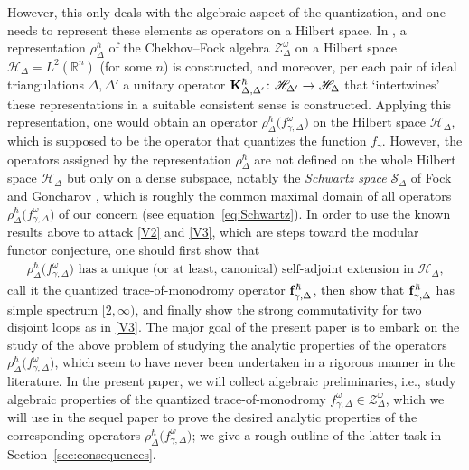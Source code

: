 \documentclass[pdftex]{sigma}
\numberwithin{equation}{section}
\theoremstyle{definition}
\begin{document}
However, this only deals with the algebraic aspect of the quantization, and one needs to represent these elements as operators on a Hilbert space. In \cite{ F97,CF, FG09, Kim_irreducible}, a representation $\rho^\hbar_\Delta$ of the Chekhov--Fock algebra $\mathcal{Z}^\omega_\Delta$ on a Hilbert space $\mathscr{H}_\Delta = L^2(\mathbb{R}^n)$ (for some $n$) is constructed, and moreover, per each pair of ideal triangulations $\Delta,\Delta'$ a unitary operator ${\bf K}^\hbar_{\Delta,\Delta'} \colon \mathscr{H}_{\Delta'} \to \mathscr{H}_\Delta$ that `intertwines' these representations in a suitable consistent sense is constructed. Applying this representation, one would obtain an operator $\rho^\hbar_\Delta\bigl(f^\omega_{\gamma,\Delta}\bigr)$ on the Hilbert space $\mathscr{H}_\Delta$, which is supposed to be the operator that quantizes the function $f_\gamma$. However, the operators assigned by the representation $\rho^\hbar_\Delta$ are not defined on the whole Hilbert space $\mathscr{H}_\Delta$ but only on a dense subspace, notably the {\em Schwartz space} $\mathscr{S}_\Delta$ of Fock and Goncharov \cite[Definition~5.2]{FG09}, which is roughly the common maximal domain of all operators $\rho^\hbar_\Delta\bigl(f^\omega_{\gamma,\Delta}\bigr)$ of our concern (see equation~\eqref{eq:Schwartz}).
In order to use the known results above to attack \ref{V2} and \ref{V3}, which are steps toward the modular functor conjecture, one should first show that
\begin{align}
\label{eq:intro_essential_uniqueness}
\mbox{$\rho^\hbar_\Delta\bigl(f^\omega_{\gamma,\Delta}\bigr)$ has a unique (or at least, canonical) self-adjoint extension in $\mathscr{H}_\Delta$,}
\end{align}
call it the quantized trace-of-monodromy operator ${\bf f}^\hbar_{\gamma,\Delta}$, then show that ${\bf f}^\hbar_{\gamma,\Delta}$ has simple spectrum $[2,\infty)$, and finally show the strong commutativity for two disjoint loops as in \ref{V3}.
The major goal of the present paper is to embark on the study of the above problem of studying the analytic properties of the operators $\rho^\hbar_\Delta\bigl(f^\omega_{\gamma,\Delta}\bigr)$, which seem to have never been undertaken in a rigorous manner in the literature. In the present paper, we will collect algebraic preliminaries, i.e., study algebraic properties of the quantized trace-of-monodromy $f^\omega_{\gamma,\Delta} \in \mathcal{Z}^\omega_\Delta$, which we will use in the sequel paper \cite{sequel} to prove the desired analytic properties of the corresponding operators $\rho^\hbar_\Delta\bigl(f^\omega_{\gamma,\Delta}\bigr)$; we give a rough outline of the latter task in Section~\ref{sec:consequences}.
\end{document}
